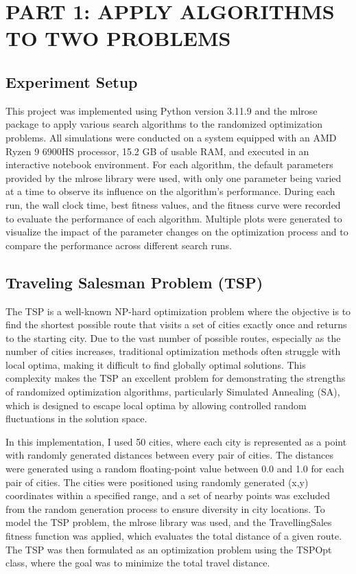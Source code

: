 \section{PART 1: APPLY ALGORITHMS TO TWO PROBLEMS}
\subsection{Experiment Setup}
This project was implemented using Python version 3.11.9 and the mlrose \cite{Hayes19} package to apply various search algorithms to the randomized optimization problems. All simulations were conducted on a system equipped with an AMD Ryzen 9 6900HS processor, 15.2 GB of usable RAM, and executed in an interactive notebook environment. For each algorithm, the default parameters provided by the mlrose library were used, with only one parameter being varied at a time to observe its influence on the algorithm's performance. During each run, the wall clock time, best fitness values, and the fitness curve were recorded to evaluate the performance of each algorithm. Multiple plots were generated to visualize the impact of the parameter changes on the optimization process and to compare the performance across different search runs.
\subsection{Traveling Salesman Problem (TSP)}
The TSP \cite{LAPORTE1992231} is a well-known NP-hard optimization problem where the objective is to find the shortest possible route that visits a set of cities exactly once and returns to the starting city. Due to the vast number of possible routes, especially as the number of cities increases, traditional optimization methods often struggle with local optima, making it difficult to find globally optimal solutions. This complexity makes the TSP an excellent problem for demonstrating the strengths of randomized optimization algorithms, particularly Simulated Annealing (SA), which is designed to escape local optima by allowing controlled random fluctuations in the solution space.

In this implementation, I used 50 cities, where each city is represented as a point with randomly generated distances between every pair of cities. The distances were generated using a random floating-point value between 0.0 and 1.0 for each pair of cities. The cities were positioned using randomly generated (x,y) coordinates within a specified range, and a set of nearby points was excluded from the random generation process to ensure diversity in city locations. To model the TSP problem, the mlrose library was used, and the TravellingSales fitness function was applied, which evaluates the total distance of a given route. The TSP was then formulated as an optimization problem using the TSPOpt class, where the goal was to minimize the total travel distance.

